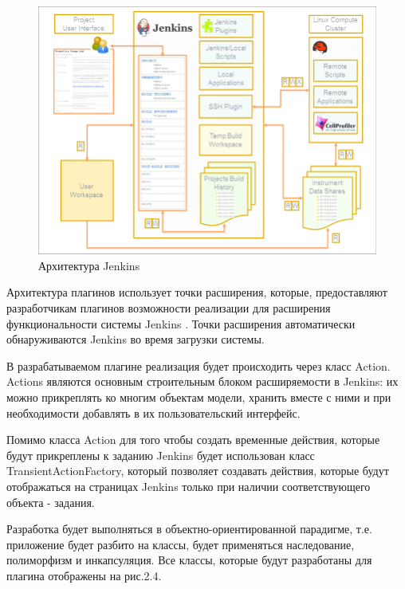\begin{figure}[ht!] 
	\center
	\includegraphics [scale=0.47] {my_folder/images//ArchitectureJenkins}
	\caption{Архитектура Jenkins \cite{article}} 
	\label{fig:ArchitectureJenkins}  
\end{figure}


Архитектура плагинов использует точки расширения, которые, предоставляют разработчикам плагинов возможности реализации для расширения функциональности системы Jenkins \cite{atchplugin}. Точки расширения автоматически обнаруживаются Jenkins во время загрузки системы.

В разрабатываемом плагине реализация будет происходить через класс Action. Actions являются основным строительным блоком расширяемости в Jenkins: их можно прикреплять ко многим объектам модели, хранить вместе с ними и при необходимости добавлять в их пользовательский интерфейс.

Помимо класса Action для того чтобы создать временные действия, которые будут прикреплены к заданию Jenkins будет использован класс TransientActionFactory, который позволяет создавать действия, которые будут отображаться на страницах Jenkins только при наличии соответствующего объекта - задания.

Разработка будет выполняться в объектно-ориентированной парадигме, т.е. приложение будет разбито на классы, будет применяться наследование, полиморфизм и инкапсуляция. Все классы, которые будут разработаны для плагина отображены на рис.2.4. 

